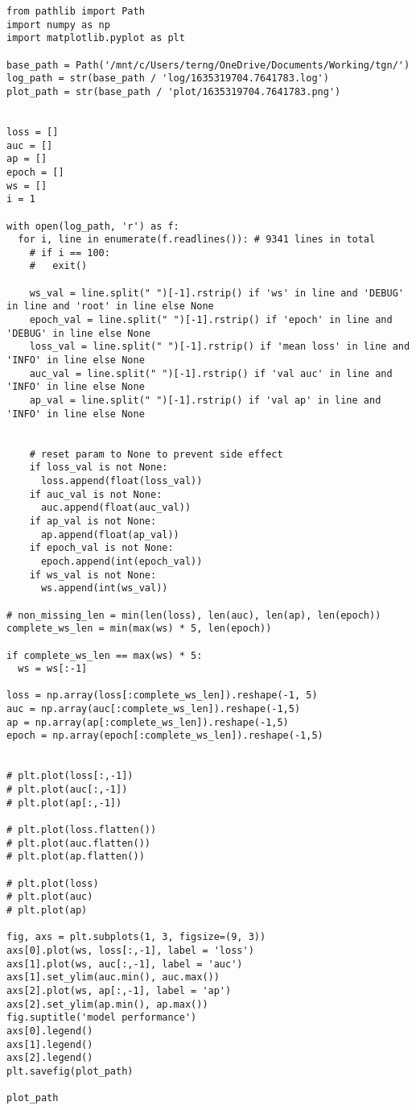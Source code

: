 \documentclass[11pt]{article}
\begin{document}
\begin{verbatim}
from pathlib import Path
import numpy as np
import matplotlib.pyplot as plt

base_path = Path('/mnt/c/Users/terng/OneDrive/Documents/Working/tgn/')
log_path = str(base_path / 'log/1635319704.7641783.log')
plot_path = str(base_path / 'plot/1635319704.7641783.png')


loss = []
auc = []
ap = []
epoch = []
ws = []
i = 1

with open(log_path, 'r') as f:
  for i, line in enumerate(f.readlines()): # 9341 lines in total
    # if i == 100:
    #   exit()

    ws_val = line.split(" ")[-1].rstrip() if 'ws' in line and 'DEBUG' in line and 'root' in line else None
    epoch_val = line.split(" ")[-1].rstrip() if 'epoch' in line and 'DEBUG' in line else None
    loss_val = line.split(" ")[-1].rstrip() if 'mean loss' in line and 'INFO' in line else None
    auc_val = line.split(" ")[-1].rstrip() if 'val auc' in line and 'INFO' in line else None
    ap_val = line.split(" ")[-1].rstrip() if 'val ap' in line and 'INFO' in line else None


    # reset param to None to prevent side effect
    if loss_val is not None:
      loss.append(float(loss_val))
    if auc_val is not None:
      auc.append(float(auc_val))
    if ap_val is not None:
      ap.append(float(ap_val))
    if epoch_val is not None:
      epoch.append(int(epoch_val))
    if ws_val is not None:
      ws.append(int(ws_val))

# non_missing_len = min(len(loss), len(auc), len(ap), len(epoch))
complete_ws_len = min(max(ws) * 5, len(epoch))

if complete_ws_len == max(ws) * 5:
  ws = ws[:-1]

loss = np.array(loss[:complete_ws_len]).reshape(-1, 5)
auc = np.array(auc[:complete_ws_len]).reshape(-1,5)
ap = np.array(ap[:complete_ws_len]).reshape(-1,5)
epoch = np.array(epoch[:complete_ws_len]).reshape(-1,5)


# plt.plot(loss[:,-1])
# plt.plot(auc[:,-1])
# plt.plot(ap[:,-1])

# plt.plot(loss.flatten())
# plt.plot(auc.flatten())
# plt.plot(ap.flatten())

# plt.plot(loss)
# plt.plot(auc)
# plt.plot(ap)

fig, axs = plt.subplots(1, 3, figsize=(9, 3))
axs[0].plot(ws, loss[:,-1], label = 'loss')
axs[1].plot(ws, auc[:,-1], label = 'auc')
axs[1].set_ylim(auc.min(), auc.max())
axs[2].plot(ws, ap[:,-1], label = 'ap')
axs[2].set_ylim(ap.min(), ap.max())
fig.suptitle('model performance')
axs[0].legend()
axs[1].legend()
axs[2].legend()
plt.savefig(plot_path)

plot_path
\end{verbatim}
\end{document}
